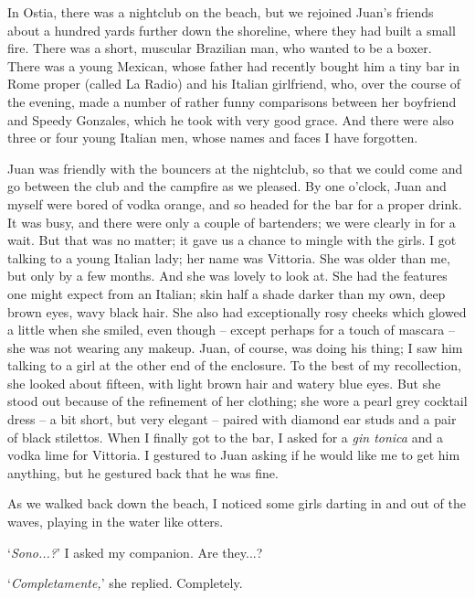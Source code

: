 In Ostia, there was a nightclub on the beach, but we rejoined Juan's friends about a hundred yards further down the shoreline, where they had built a small fire. There was a short, muscular Brazilian man, who wanted to be a boxer. There was a young Mexican, whose father had recently bought him a tiny bar in Rome proper (called La Radio) and his Italian girlfriend, who, over the course of the evening, made a number of rather funny comparisons between her boyfriend and Speedy Gonzales, which he took with very good grace. And there were also three or four young Italian men, whose names and faces I have forgotten.

Juan was friendly with the bouncers at the nightclub, so that we could come and go between the club and the campfire as we pleased. By one o'clock, Juan and myself were bored of vodka orange, and so headed for the bar for a proper drink. It was busy, and there were only a couple of bartenders; we were clearly in for a wait. But that was no matter; it gave us a chance to mingle with the girls. I got talking to a young Italian lady; her name was Vittoria. She was older than me, but only by a few months. And she was lovely to look at. She had the features one might expect from an Italian; skin half a shade darker than my own, deep brown eyes, wavy black hair. She also had exceptionally rosy cheeks which glowed a little when she smiled, even though -- except perhaps for a touch of mascara -- she was not wearing any makeup. Juan, of course, was doing his thing; I saw him talking to a girl at the other end of the enclosure. To the best of my recollection, she looked about fifteen, with light brown hair and watery blue eyes. But she stood out because of the refinement of her clothing; she wore a pearl grey cocktail dress -- a bit short, but very elegant -- paired with diamond ear studs and a pair of black stilettos. When I finally got to the bar, I asked for a \textit{gin tonica} and a vodka lime for Vittoria. I gestured to Juan asking if he would like me to get him anything, but he gestured back that he was fine.

As we walked back down the beach, I noticed some girls darting in and out of the waves, playing in the water like otters.

`\textit{Sono...?}' I asked my companion. \hspace{0.5in} {\footnotesize Are they...?}

`\textit{Completamente,}' she replied. \hspace{0.5in} {\footnotesize Completely.}

